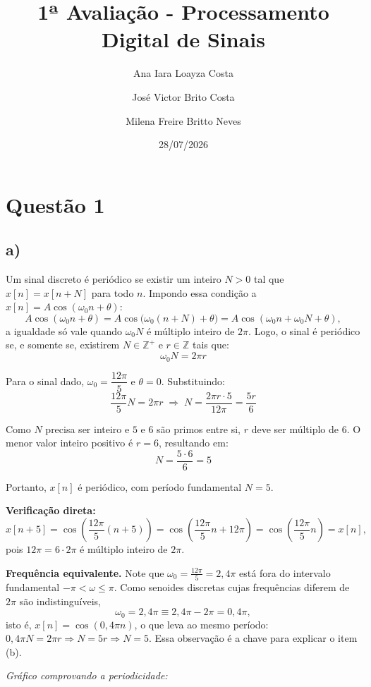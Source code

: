 \documentclass[12pt]{article}
\title{1ª Avaliação - Processamento Digital de Sinais}
\author{Ana Iara Loayza Costa \and José Victor Brito Costa \and Milena Freire Britto Neves}
\date{28/07/2026}
\begin{document}
\maketitle

\section*{Questão 1}

\subsection*{a) }

Um sinal discreto é periódico se existir um inteiro $N > 0$ tal que $x[n] = x[n+N]$
para todo $n$. Impondo essa condição a $x[n] = A\cos(\omega_0 n + \theta)$:
\[
A\cos(\omega_0 n + \theta) = A\cos\big(\omega_0(n+N) + \theta\big)
 = A\cos(\omega_0 n + \omega_0 N + \theta),
\]
a igualdade só vale quando $\omega_0 N$ é múltiplo inteiro de $2\pi$. Logo, o sinal é
periódico se, e somente se, existirem $N \in \mathbb{Z}^+$ e $r \in \mathbb{Z}$ tais que:
\[
\omega_0 N = 2\pi r
\]

Para o sinal dado, $\omega_0 = \dfrac{12\pi}{5}$ e $\theta = 0$. Substituindo:
\[
\frac{12\pi}{5}N = 2\pi r \;\Rightarrow\; N = \frac{2\pi r \cdot 5}{12\pi} = \frac{5r}{6}
\]

Como $N$ precisa ser inteiro e $5$ e $6$ são primos entre si, $r$ deve ser múltiplo de
$6$. O menor valor inteiro positivo é $r = 6$, resultando em:
\[
N = \frac{5 \cdot 6}{6} = 5
\]

Portanto, $x[n]$ é periódico, com período fundamental $N = 5$.

\medskip
\noindent\textbf{Verificação direta:}
\[
x[n+5] = \cos\!\left(\frac{12\pi}{5}(n+5)\right)
       = \cos\!\left(\frac{12\pi}{5}n + 12\pi\right)
       = \cos\!\left(\frac{12\pi}{5}n\right) = x[n],
\]
pois $12\pi = 6 \cdot 2\pi$ é múltiplo inteiro de $2\pi$.

\medskip
\noindent\textbf{Frequência equivalente.} Note que $\omega_0 = \frac{12\pi}{5} = 2{,}4\pi$
está fora do intervalo fundamental $-\pi < \omega \le \pi$. Como senoides discretas cujas
frequências diferem de $2\pi$ são indistinguíveis,
\[
\omega_0 = 2{,}4\pi \equiv 2{,}4\pi - 2\pi = 0{,}4\pi,
\]
isto é, $x[n] = \cos(0{,}4\pi n)$, o que leva ao mesmo período:
$0{,}4\pi N = 2\pi r \Rightarrow N = 5r \Rightarrow N = 5$. Essa observação é a chave
para explicar o item (b).

\bigskip
\noindent\textit{Gráfico comprovando a periodicidade:}
\end{document}
